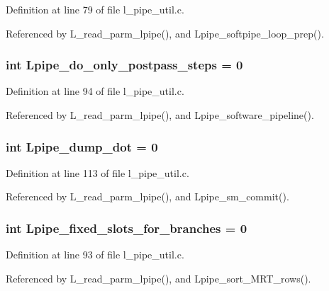 Definition at line 79 of file l\_\-pipe\_\-util.c.

Referenced by L\_\-read\_\-parm\_\-lpipe(), and Lpipe\_\-softpipe\_\-loop\_\-prep().
\subsubsection{\setlength{\rightskip}{0pt plus 5cm}int \bf{Lpipe\_\-do\_\-only\_\-postpass\_\-steps} = 0}\label{l__pipe__util_8c_414f010c3e4a932c6061bb593e7945b0}




Definition at line 94 of file l\_\-pipe\_\-util.c.

Referenced by L\_\-read\_\-parm\_\-lpipe(), and Lpipe\_\-software\_\-pipeline().
\subsubsection{\setlength{\rightskip}{0pt plus 5cm}int \bf{Lpipe\_\-dump\_\-dot} = 0}\label{l__pipe__util_8c_2b86b75abb1973402ba2363621a03bb3}




Definition at line 113 of file l\_\-pipe\_\-util.c.

Referenced by L\_\-read\_\-parm\_\-lpipe(), and Lpipe\_\-sm\_\-commit().
\subsubsection{\setlength{\rightskip}{0pt plus 5cm}int \bf{Lpipe\_\-fixed\_\-slots\_\-for\_\-branches} = 0}\label{l__pipe__util_8c_5dfc4a9a1248286c8e15ad45456ddb90}




Definition at line 93 of file l\_\-pipe\_\-util.c.

Referenced by L\_\-read\_\-parm\_\-lpipe(), and Lpipe\_\-sort\_\-MRT\_\-rows().
